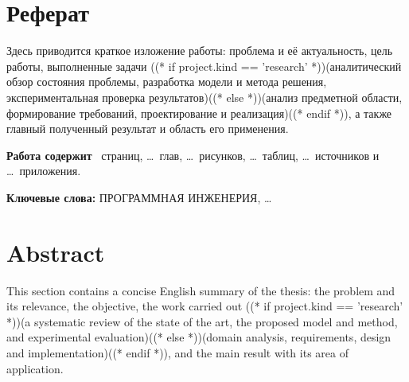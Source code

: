 \documentclass[12pt,a4paper]{extreport}
\begin{document}


\chapter*{Реферат}

Здесь приводится краткое изложение работы: проблема и её
актуальность, цель работы, выполненные задачи
((* if project.kind == 'research' *))(аналитический обзор состояния проблемы, разработка
модели и метода решения, экспериментальная проверка результатов)((* else *))(анализ предметной
области, формирование требований, проектирование и реализация)((* endif *)),
а также главный полученный результат и область его применения.

\medskip
\textbf{Работа содержит} \pageref{LastPage}~страниц, \ldots~глав,
\ldots~рисунков, \ldots~таблиц, \ldots~источников и \ldots~приложения.

\medskip
\textbf{Ключевые слова:} ПРОГРАММНАЯ ИНЖЕНЕРИЯ, \ldots

\clearpage

\chapter*{Abstract}

This section contains a concise English summary of the thesis: the
problem and its relevance, the objective, the work carried out
((* if project.kind == 'research' *))(a systematic review of the state of the art, the proposed
model and method, and experimental evaluation)((* else *))(domain analysis, requirements,
design and implementation)((* endif *)), and the
main result with its area of application.
\end{document}
